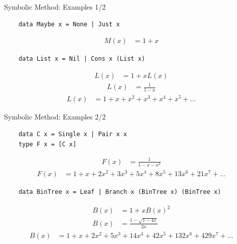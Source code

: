 \documentclass[pdf]{beamer}
\begin{document}
\begin{frame}[fragile]{Symbolic Method: Examples 1/2}
  \begin{verbatim}
    data Maybe x = None | Just x
  \end{verbatim}
  \begin{align*}
    M(x) &= 1 + x
  \end{align*}

  \begin{verbatim}
    data List x = Nil | Cons x (List x)
  \end{verbatim}
  \begin{align*}
    L(x) &= 1 + x L(x)
  \end{align*}
  \begin{align*}
    L(x) &= \frac{1}{1-x}
  \end{align*}
  \begin{align*}
    L(x) &= 1 + x + x^2 + x^3 + x^4 + x^5 + \ldots
  \end{align*}
\end{frame}

\begin{frame}[fragile]{Symbolic Method: Examples 2/2}
  \begin{verbatim}
    data C x = Single x | Pair x x
    type F x = [C x]
  \end{verbatim}
  \begin{align*}
    F(x) &= \frac{1}{1 - x - x^2}
  \end{align*}
  \begin{align*}
    F(x) &= 1 + x + 2 x^2 + 3 x^3 + 5 x^4 + 8 x^5 + 13 x^6 + 21 x^7 + \ldots
  \end{align*}
  \begin{verbatim}
    data BinTree x = Leaf | Branch x (BinTree x) (BinTree x)
  \end{verbatim}
  \begin{align*}
    B(x) &= 1 + x B(x)^2 \\
    B(x) &= \frac{1 - \sqrt{1 - 4x}}{2x}
  \end{align*}
  \begin{align*}
    B(x) &= 1 + x + 2x^2 + 5x^3 + 14x^4 + 42x^5 + 132x^6 + 429x^7 + \ldots
  \end{align*}
\end{frame}
\end{document}
